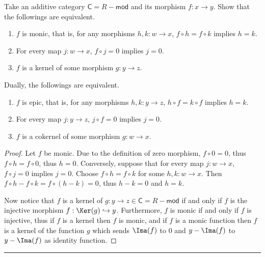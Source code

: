 \begin{prop} Take an additive category $\mathsf{C}=R-\mathsf{mod}$ and its morphism $f:x\rightarrow y$. Show that the followings are equivalent.
\begin{enumerate}
\item $f$ is monic, that is, for any morphisms $h,k:w\rightarrow x$, $f\circ h=f\circ k$ implies $h=k$.
\item For every map $j:w\rightarrow x$, $f\circ j=0$ implies $j=0$.
\item $f$ is a kernel of some morphism $g:y\rightarrow z$.
\end{enumerate}
Dually, the followings are equivalent.
\begin{enumerate}
\item $f$ is epic, that is, for any morphisms $h,k:y\rightarrow z$, $h\circ f=k\circ f$ implies $h=k$.
\item For every map $j:y\rightarrow z$, $j\circ f=0$ implies $j=0$.
\item $f$ is a cokernel of some morphism $g:w\rightarrow x$.
\end{enumerate}
\end{prop}
\begin{proof}
Let $f$ be monic. Due to the definition of zero morphism, $f\circ 0=0$, thus $f\circ h=f\circ 0$, thus $h=0$. Conversely, suppose that for every map $j:w\rightarrow x$, $f\circ j=0$ implies $j=0$. Choose $f\circ h=f\circ k$ for some $h,k:w\rightarrow x$. Then $f\circ h-f\circ k=f\circ (h-k)=0$, thus $h-k=0$ and $h=k$.

Now notice that $f$ is a kernel of $g:y\rightarrow z\in \mathsf{C}=R-\mathsf{mod}$ if and only if $f$ is the injective morphism $f:\Ker(g)\hookrightarrow y$. Furthermore, $f$ is monic if and only if $f$ is injective, thus if $f$ is a kernel then $f$ is monic, and if $f$ is a monic function then $f$ is a kernel of the function $g$ which sends $\Ima(f)$ to $0$ and $y-\Ima(f)$ to $y-\Ima(f)$ as identity function.
\end{proof}
\noindent\rule{\textwidth}{1pt}
\newline